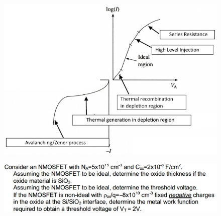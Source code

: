 \documentclass[11pt,landscape]{article}
\begin{document}
\begin{multicols}{3}
\begin{figure}[H]
\end{figure}
\begin{figure}[H]
    \includegraphics[scale=0.50]{./Images/2/DiodeIV.jpg}
\end{figure}
\begin{figure}[H]
    \includegraphics[scale=0.53]{./Images/3/12.jpg}
\end{figure}

\end{multicols}
\end{document}
